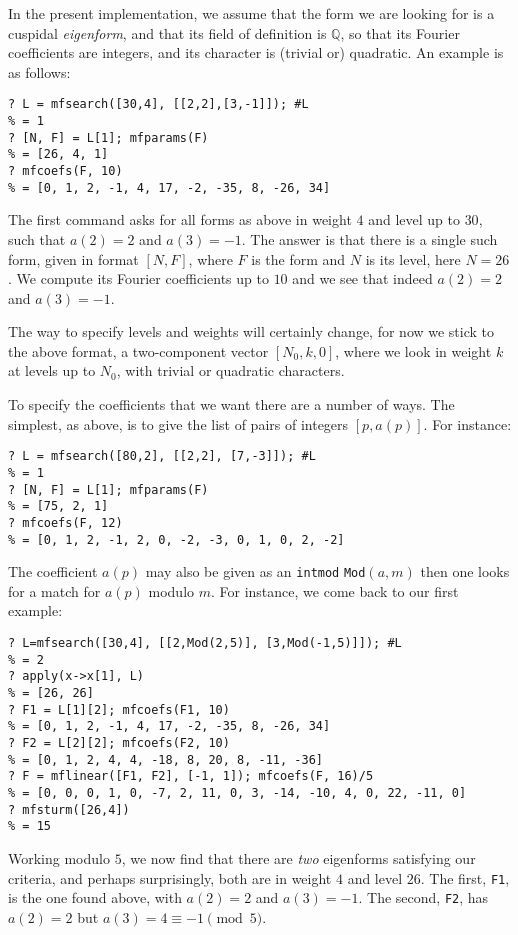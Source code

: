 \documentclass[11pt]{article}
\newcommand{\Q}{{\mathbb Q}}
\def\kbd#1{{\tt #1}}
\begin{document}
In the present implementation, we assume that the form we are looking
for is a cuspidal \emph{eigenform}, and that its field of definition is $\Q$,
so that its Fourier coefficients are integers, and its character is
(trivial or) quadratic. An example is as follows:

\begin{verbatim}
? L = mfsearch([30,4], [[2,2],[3,-1]]); #L
% = 1
? [N, F] = L[1]; mfparams(F)
% = [26, 4, 1]
? mfcoefs(F, 10)
% = [0, 1, 2, -1, 4, 17, -2, -35, 8, -26, 34]
\end{verbatim}

The first command asks for all forms as above in weight $4$ and level
up to $30$, such that $a(2)=2$ and $a(3)=-1$. The answer is that there is a
single such form, given in format $[N,F]$, where $F$ is the form
and $N$ is its level, here $N = 26$. We compute its Fourier coefficients up
to $10$ and we see that indeed $a(2)=2$ and $a(3)=-1$.

The way to specify levels and weights will certainly change, for now we
stick to the above format, a two-component vector $[N_0,k,0]$,
where we look in weight $k$ at levels up to $N_0$, with trivial
or quadratic characters.

To specify the coefficients that we want there are a number of ways. The
simplest, as above, is to give the list of pairs of integers $[p,a(p)]$.
For instance:

\begin{verbatim}
? L = mfsearch([80,2], [[2,2], [7,-3]]); #L
% = 1
? [N, F] = L[1]; mfparams(F)
% = [75, 2, 1]
? mfcoefs(F, 12)
% = [0, 1, 2, -1, 2, 0, -2, -3, 0, 1, 0, 2, -2]
\end{verbatim}

The coefficient $a(p)$ may also be given as an \kbd{intmod} \kbd{Mod}$(a,m)$
then one looks for a match for $a(p)$ modulo $m$. For instance, we come
back to our first example:
\begin{verbatim}
? L=mfsearch([30,4], [[2,Mod(2,5)], [3,Mod(-1,5)]]); #L
% = 2
? apply(x->x[1], L)
% = [26, 26]
? F1 = L[1][2]; mfcoefs(F1, 10)
% = [0, 1, 2, -1, 4, 17, -2, -35, 8, -26, 34]
? F2 = L[2][2]; mfcoefs(F2, 10)
% = [0, 1, 2, 4, 4, -18, 8, 20, 8, -11, -36]
? F = mflinear([F1, F2], [-1, 1]); mfcoefs(F, 16)/5
% = [0, 0, 0, 1, 0, -7, 2, 11, 0, 3, -14, -10, 4, 0, 22, -11, 0]
? mfsturm([26,4])
% = 15
\end{verbatim}

Working modulo $5$, we now find that there are \emph{two} eigenforms
satisfying our criteria, and perhaps surprisingly, both are in weight $4$
and level $26$. The first, \kbd{F1}, is the one found above, with
$a(2)=2$ and $a(3)=-1$. The second, \kbd{F2}, has $a(2)=2$ but
$a(3)=4\equiv-1\pmod5$.
\end{document}
